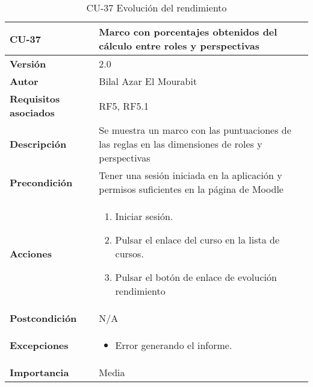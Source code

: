 \begin{table}[H]
	\centering
	\begin{tabularx}{\linewidth}{ p{} p{} }
		\toprule
		\textbf{CU-37}    & \textbf{Marco con porcentajes obtenidos del cálculo entre roles y perspectivas}\\
		\toprule
		\textbf{Versión}              & 2.0   \\
		\textbf{Autor}                & Bilal Azar El Mourabit \\
		\textbf{Requisitos asociados} & RF5, RF5.1\\
		\textbf{Descripción}          & Se muestra un marco con las puntuaciones de las reglas en las dimensiones de roles y perspectivas\\
    		\textbf{Precondición}         & Tener una sesión iniciada en la aplicación y permisos suficientes en la página de Moodle\\
		\textbf{Acciones}             & 
		\begin{enumerate}
			\def\labelenumi{\arabic{enumi}.}
			\tightlist
			\item Iniciar sesión.
            \item Pulsar el enlace del curso en la lista de cursos.
            \item Pulsar el botón de enlace de evolución rendimiento
		\end{enumerate}\\
		\textbf{Postcondición}        & N/A \\
		\textbf{Excepciones}          & \begin{itemize}
		    \item Error generando el informe.
		\end{itemize} \\
		\textbf{Importancia}          & Media \\
		\bottomrule
	\end{tabularx}
	\caption{CU-37 Evolución del rendimiento}
\end{table}

